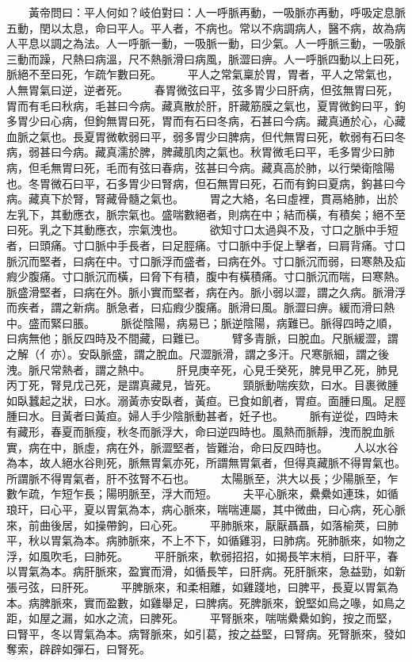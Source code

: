 　　黃帝問曰：平人何如？岐伯對曰：人一呼脈再動，一吸脈亦再動，呼吸定息脈五動，閏以太息，命曰平人。平人者，不病也。常以不病調病人，醫不病，故為病人平息以調之為法。人一呼脈一動，一吸脈一動，曰少氣。人一呼脈三動，一吸脈三動而躁，尺熱曰病溫，尺不熱脈滑曰病風，脈澀曰痹。人一呼脈四動以上曰死，脈絕不至曰死，乍疏乍數曰死。
　　平人之常氣稟於胃，胃者，平人之常氣也，人無胃氣曰逆，逆者死。
　　春胃微弦曰平，弦多胃少曰肝病，但弦無胃曰死，胃而有毛曰秋病，毛甚曰今病。藏真散於肝，肝藏筋膜之氣也，夏胃微鉤曰平，鉤多胃少曰心病，但鉤無胃曰死，胃而有石曰冬病，石甚曰今病。藏真通於心，心藏血脈之氣也。長夏胃微軟弱曰平，弱多胃少曰脾病，但代無胃曰死，軟弱有石曰冬病，弱甚曰今病。藏真濡於脾，脾藏肌肉之氣也。秋胃微毛曰平，毛多胃少曰肺病，但毛無胃曰死，毛而有弦曰春病，弦甚曰今病。藏真高於肺，以行榮衛陰陽也。冬胃微石曰平，石多胃少曰腎病，但石無胃曰死，石而有鉤曰夏病，鉤甚曰今病。藏真下於腎，腎藏骨髓之氣也。
　　胃之大絡，名曰虛裡，貫鬲絡肺，出於左乳下，其動應衣，脈宗氣也。盛喘數絕者，則病在中；結而橫，有積矣；絕不至曰死。乳之下其動應衣，宗氣洩也。
　　欲知寸口太過與不及，寸口之脈中手短者，曰頭痛。寸口脈中手長者，曰足脛痛。寸口脈中手促上擊者，曰肩背痛。寸口脈沉而堅者，曰病在中。寸口脈浮而盛者，曰病在外。寸口脈沉而弱，曰寒熱及疝瘕少腹痛。寸口脈沉而橫，曰脅下有積，腹中有橫積痛。寸口脈沉而喘，曰寒熱。脈盛滑堅者，曰病在外。脈小實而堅者，病在內。脈小弱以澀，謂之久病。脈滑浮而疾者，謂之新病。脈急者，曰疝瘕少腹痛。脈滑曰風。脈澀曰痹。緩而滑曰熱中。盛而緊曰脹。
　　脈從陰陽，病易已；脈逆陰陽，病難已。脈得四時之順，曰病無他；脈反四時及不間藏，曰難已。
　　臂多青脈，曰脫血。尺脈緩澀，謂之解（亻亦）。安臥脈盛，謂之脫血。尺澀脈滑，謂之多汗。尺寒脈細，謂之後洩。脈尺常熱者，謂之熱中。
　　肝見庚辛死，心見壬癸死，脾見甲乙死，肺見丙丁死，腎見戊己死，是謂真藏見，皆死。
　　頸脈動喘疾欬，曰水。目裹微腫如臥蠶起之狀，曰水。溺黃赤安臥者，黃疸。已食如飢者，胃疸。面腫曰風。足脛腫曰水。目黃者曰黃疸。婦人手少陰脈動甚者，妊子也。
　　脈有逆從，四時未有藏形，春夏而脈瘦，秋冬而脈浮大，命曰逆四時也。風熱而脈靜，洩而脫血脈實，病在中，脈虛，病在外，脈澀堅者，皆難治，命曰反四時也。
　　人以水谷為本，故人絕水谷則死，脈無胃氣亦死，所謂無胃氣者，但得真藏脈不得胃氣也。所謂脈不得胃氣者，肝不弦腎不石也。
　　太陽脈至，洪大以長；少陽脈至，乍數乍疏，乍短乍長；陽明脈至，浮大而短。
　　夫平心脈來，纍纍如連珠，如循琅玕，曰心平，夏以胃氣為本，病心脈來，喘喘連屬，其中微曲，曰心病，死心脈來，前曲後居，如操帶鉤，曰心死。
　　平肺脈來，厭厭聶聶，如落榆莢，曰肺平，秋以胃氣為本。病肺脈來，不上不下，如循雞羽，曰肺病。死肺脈來，如物之浮，如風吹毛，曰肺死。
　　平肝脈來，軟弱招招，如揭長竿末梢，曰肝平，春以胃氣為本。病肝脈來，盈實而滑，如循長竿，曰肝病。死肝脈來，急益勁，如新張弓弦，曰肝死。
　　平脾脈來，和柔相離，如雞踐地，曰脾平，長夏以胃氣為本。病脾脈來，實而盈數，如雞舉足，曰脾病。死脾脈來，銳堅如烏之喙，如鳥之距，如屋之漏，如水之流，曰脾死。
　　平腎脈來，喘喘纍纍如鉤，按之而堅，曰腎平，冬以胃氣為本。病腎脈來，如引葛，按之益堅，曰腎病。死腎脈來，發如奪索，辟辟如彈石，曰腎死。

